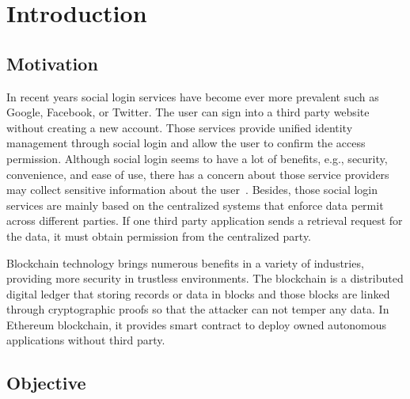 \chapter{Introduction}
\label{chapter:intro}
\section{Motivation}
In recent years social login services have become ever more prevalent such as Google, Facebook, or Twitter. The user can sign into a third party website without creating a new account. Those services provide unified identity management through social login and allow the user to confirm the access permission. Although social login seems to have a lot of benefits, e.g., security, convenience, and ease of use, there has a concern about those service providers may collect sensitive information about the user~\cite{gafni2014social}.
Besides, those social login services are mainly based on the centralized systems that enforce data permit across different parties. If one third party application sends a retrieval request for the data, it must obtain permission from the centralized party.\par
Blockchain technology brings numerous benefits in a variety of industries, providing more security in trustless environments. The blockchain is a distributed digital ledger that storing records or data in blocks and those blocks are linked through cryptographic proofs so that the attacker can not temper any data. In Ethereum blockchain, it provides smart contract to deploy owned autonomous applications without third party.

\section{Objective}
